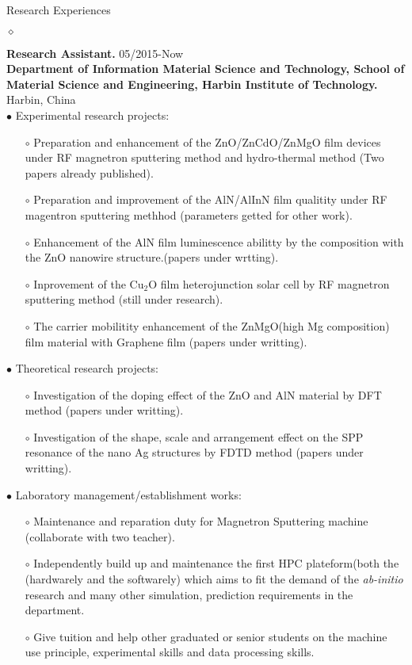 \documentclass[a4paper]{article}
\makeatletter
\renewcommand{\section}{\@startsection  
{section}  
{12}  
{\z@}  
{0.2\baselineskip}  
{0.1\baselineskip}  
{\normalfont\large\scshape\bfseries}}
\newcommand{\dline} {\vspace{-0.3cm}
\noindent\hrulefill 

}
\newcommand{\entry}[5]
{
	\noindent
	$\diamond$ \parbox[t]{\textwidth}
	{
		 \textbf{{#2}} \small
		 \hfill #1
		 \\ \textbf{#3} \hfill {#4}
	\\#5
	}\\ \normalsize  
}
\makeatother
\begin{document}
\section{Research Experiences}%
\dline
\entry
{05/2015-Now}
{{Research Assistant.}  }
{Department of Information Material Science and Technology, School of Material Science and Engineering, Harbin Institute of Technology.}
{Harbin, China}
{
	$\bullet$ Experimental research projects: 
	\begin{itemize}
	\item[$\circ$]Preparation and enhancement of the ZnO/ZnCdO/ZnMgO film devices under RF magnetron sputtering method and hydro-thermal method (Two papers already published).
	\item[$\circ$]Preparation and improvement of the AlN/AlInN film qualitity under RF magentron sputtering methhod (parameters getted for other work).
	\item[$\circ$] Enhancement of the AlN film luminescence abilitty by the composition  with the ZnO nanowire structure.(papers under wrtting).
	\item[$\circ$] Inprovement of the Cu$_2$O film heterojunction solar cell by RF magnetron sputtering method (still under research).
	\item[$\circ$] The carrier mobilitity enhancement of the ZnMgO(high Mg composition) film material with Graphene film (papers under writting).
	\end{itemize}
	$\bullet$ Theoretical research projects:
	\begin{itemize}
	\item[$\circ$] Investigation of the doping effect of the ZnO and AlN material by DFT method (papers under writting).
	\item[$\circ$] Investigation of the shape, scale and arrangement effect on the SPP resonance of the nano Ag structures by FDTD method (papers under writting).
	\end{itemize}
	$\bullet$ Laboratory management/establishment works:
	\begin{itemize}
	\item[$\circ$]Maintenance and reparation duty for Magnetron Sputtering machine (collaborate with two teacher).
	\item[$\circ$] Independently build up and maintenance the first HPC plateform(both the (hardwarely and the softwarely)  which aims to fit the demand of the \emph{ab-initio} research and many other simulation, prediction requirements in the department. 
	\item[$\circ$] Give tuition and help other graduated or senior students on the machine use principle, experimental skills and data processing skills.
	\end{itemize}
}
\end{document}
